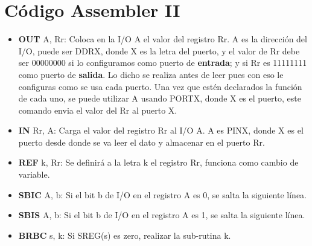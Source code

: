 \documentclass[
	12pt, %
	fleqn, %
	a4paper, %
]{LegrandOrangeBook}
\begin{document}
\section{Código Assembler II}\label{Código Assembler II}
\begin{itemize}
\item \textbf{OUT} A, Rr: Coloca en la I/O A el valor del registro Rr. A es la dirección del I/O, puede ser DDRX, donde X es la letra del puerto, y el valor de Rr debe ser 00000000 si lo configuramos como puerto de \textbf{entrada}; y si Rr es 11111111 como puerto de \textbf{salida}. Lo dicho se realiza antes de leer pues con eso le configuras como se usa cada puerto. Una vez que estén declarados la función de cada uno, se puede utilizar A usando PORTX, donde X es el puerto, este comando envia el valor del Rr al puerto X.
\item \textbf{IN} Rr, A: Carga el valor del registro Rr al I/O A. A es PINX, donde X es el puerto desde donde se va leer el dato y almacenar en el puerto Rr.
\item \textbf{REF} k, Rr: Se definirá a la letra k el registro Rr, funciona como cambio de variable.
\item \textbf{SBIC} A, b: Si el bit b de I/O en el registro A es 0, se salta la siguiente línea.
\item \textbf{SBIS} A, b: Si el bit b de I/O en el registro A es 1, se salta la siguiente línea.
\item \textbf{BRBC} s, k: Si SREG(s) es zero, realizar la sub-rutina k.
\end{itemize}
\end{document}
